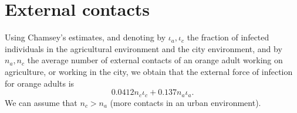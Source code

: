 \documentclass{article}
\begin{document}
\section{External contacts}
Using Chamsey's estimates, and denoting by $\iota_a,\iota_c$ the fraction of
infected individuals in the agricultural environment and the city environment,
and by $n_a,n_c$ the average number of external contacts of an orange adult working on
agriculture, or working in the city, we obtain that the external force of
infection for orange adults is
\[
0.0412 n_c \iota_c + 0.137 n_a \iota_a.
\]
We can assume that $n_c > n_a$ (more contacts in an urban environment).
\end{document}
